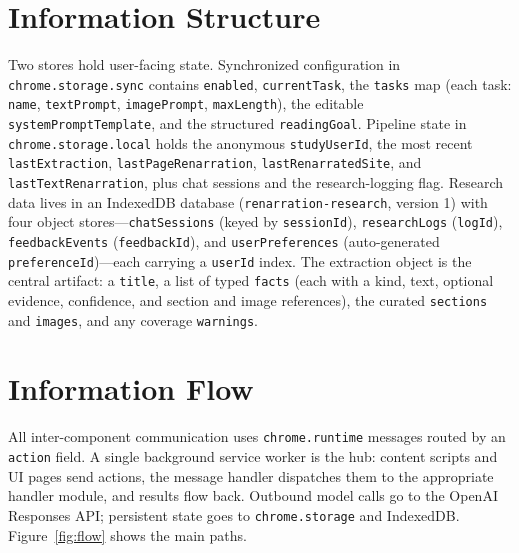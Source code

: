 \documentclass[a4paper,12pt]{report}
\begin{document}
\section{Information Structure}
Two stores hold user-facing state. Synchronized configuration in
\texttt{chrome.storage.sync} contains \texttt{enabled}, \texttt{currentTask}, the
\texttt{tasks} map (each task: \texttt{name}, \texttt{textPrompt},
\texttt{imagePrompt}, \texttt{maxLength}), the editable
\texttt{systemPromptTemplate}, and the structured \texttt{readingGoal}.
Pipeline state in \texttt{chrome.storage.local} holds the anonymous
\texttt{studyUserId}, the most recent \texttt{lastExtraction},
\texttt{lastPageRenarration}, \texttt{lastRenarratedSite}, and
\texttt{lastTextRenarration}, plus chat sessions and the research-logging flag.
Research data lives in an IndexedDB database (\texttt{renarration-research},
version 1) with four object stores---\texttt{chatSessions} (keyed by
\texttt{sessionId}), \texttt{researchLogs} (\texttt{logId}),
\texttt{feedbackEvents} (\texttt{feedbackId}), and \texttt{userPreferences}
(auto-generated \texttt{preferenceId})---each carrying a \texttt{userId} index. The
extraction object is the central artifact: a \texttt{title}, a list of typed
\texttt{facts} (each with a kind, text, optional evidence, confidence, and section
and image references), the curated \texttt{sections} and \texttt{images}, and any
coverage \texttt{warnings}.

\section{Information Flow}
All inter-component communication uses \texttt{chrome.runtime} messages routed by
an \texttt{action} field. A single background service worker is the hub: content
scripts and UI pages send actions, the message handler dispatches them to the
appropriate handler module, and results flow back. Outbound model calls go to the
OpenAI Responses API; persistent state goes to \texttt{chrome.storage} and
IndexedDB. Figure~\ref{fig:flow} shows the main paths.
\end{document}

